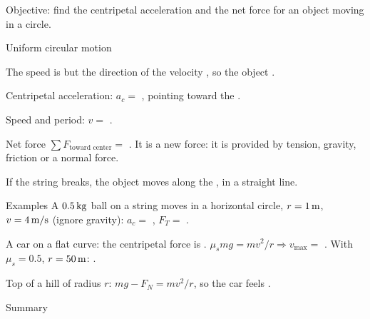 \begin{center}\textsf{\small\color{apgrey}Objective: find the centripetal acceleration and the net force for an object moving in a circle.}\end{center}
\begin{nrow}{Uniform circular motion}
\begin{minipage}[t]{0.62\linewidth}
The speed is  but the direction of the velocity , so the object .\par
Centripetal acceleration: $a_c=$ , pointing toward the .\par
Speed and period: $v=$ .
\end{minipage}\hfill
\begin{minipage}[t]{0.32\linewidth}\vspace{0pt}
\end{minipage}
\end{nrow}
\begin{nrow}{Net force}
$\sum F_\text{toward center}=$ . It is  a new force: it is provided by tension, gravity, friction or a normal force.\par
If the string breaks, the object moves along the , in a straight line.
\end{nrow}
\begin{nrow}{Examples}
A $0.5\,\mathrm{kg}$ ball on a string moves in a horizontal circle, $r=1\,\mathrm{m}$, $v=4\,\mathrm{m/s}$ (ignore gravity): $a_c=$ \fillin{$16\mss$}, $F_T=$ \fillin{$8\N$}.\par
A car on a flat curve: the centripetal force is . $\mu_smg=mv^2/r\Rightarrow v_\text{max}=$ . With $\mu_s=0.5$, $r=50\,\mathrm{m}$: .\par
Top of a hill of radius $r$: $mg-F_N=mv^2/r$, so the car feels .
\end{nrow}
\begin{nrow}{Summary}
\else\vspace{2.2cm}\fi
\end{nrow}
